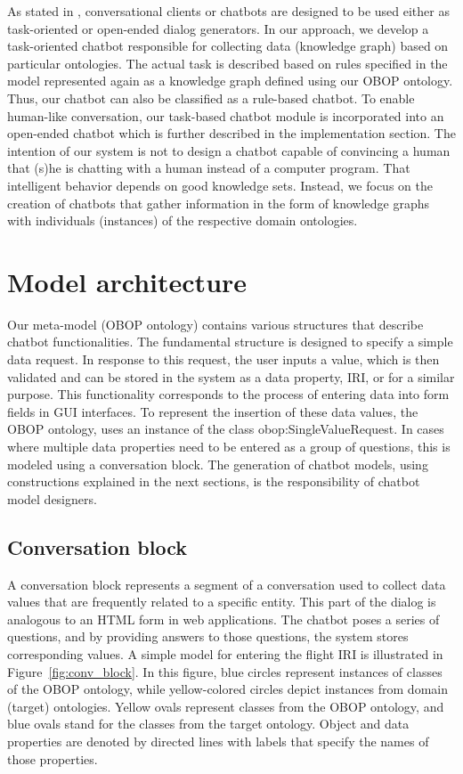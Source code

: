 \documentclass[runningheads]{llncs}
\begin{document}
As stated in \cite{agarwal2020review}, conversational clients or chatbots are designed to be used either as task-oriented or open-ended dialog generators. In our approach, we develop a task-oriented chatbot responsible for collecting data (knowledge graph) based on particular ontologies. The actual task is described based on rules specified in the model represented again as a knowledge graph defined using our OBOP ontology. Thus, our chatbot can also be classified as a rule-based chatbot. To enable human-like conversation, our task-based chatbot module is incorporated into an open-ended chatbot which is further described in the implementation section. The intention of our system is not to design a chatbot capable of convincing a human that (s)he is chatting with a human instead of a computer program. That intelligent behavior depends on good knowledge sets. Instead, we focus on the creation of chatbots that gather information in the form of knowledge graphs with individuals (instances) of the respective domain ontologies.  



\section{Model architecture}
Our meta-model (OBOP ontology) contains various structures that describe chatbot functionalities. The fundamental structure is designed to specify a simple data request. In response to this request, the user inputs a value, which is then validated and can be stored in the system as a data property, IRI, or for a similar purpose. This functionality corresponds to the process of entering data into form fields in GUI interfaces. To represent the insertion of these data values, the OBOP ontology, uses an instance of the class obop:SingleValueRequest. In cases where multiple data properties need to be entered as a group of questions, this is modeled using a conversation block. The generation of chatbot models, using constructions explained in the next sections, is the responsibility of chatbot model designers.  

\subsection{Conversation block}
A conversation block represents a segment of a conversation used to collect data values that are frequently related to a specific entity. This part of the dialog is analogous to an HTML form in web applications. The chatbot poses a series of questions, and by providing answers to those questions, the system stores corresponding values. A simple model for entering the flight IRI is illustrated in Figure~\ref{fig:conv_block}. In this figure, blue circles represent instances of classes of the OBOP ontology, while yellow-colored circles depict instances from domain (target) ontologies. Yellow ovals represent classes from the OBOP ontology, and blue ovals stand for the classes from the target ontology. Object and data properties are denoted by directed lines with labels that specify the names of those properties.     
\end{document}
